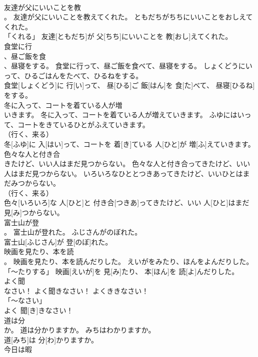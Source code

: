 \documentclass[8pt]{extreport}
\begin{document}
\begin{CJK}{UTF8}{min}
\\	友達が父にいいことを教
\\	。	友達が父にいいことを教えてくれた。	ともだちがちちにいいことをおしえてくれた。	
\\	「くれる」	友達[ともだち]が 父[ちち]にいいことを 教[おし]えてくれた。		
\\	食堂に行
\\	、昼ご飯を食
\\	、昼寝をする。	食堂に行って、昼ご飯を食べて、昼寝をする。	しょくどうにいって、ひるごはんをたべて、ひるねをする。	
\\	食堂[しょくどう]に 行[い]って、 昼[ひる]ご 飯[はん]を 食[た]べて、 昼寝[ひるね]をする。		
\\	冬に入って、コートを着ている人が増
\\	いきます。	冬に入って、コートを着ている人が増えていきます。	ふゆにはいって、コートをきているひとがふえていきます。	
\\	（行く、来る） 
\\	冬[ふゆ]に 入[はい]って、コートを 着[き]ている 人[ひと]が 増[ふ]えていきます。		
\\	色々な人と付き合
\\	きたけど、いい人はまだ見つからない。	色々な人と付き合ってきたけど、いい人はまだ見つからない。	いろいろなひととつきあってきたけど、いいひとはまだみつからない。	
\\	（行く、来る） 
\\	色々[いろいろ]な 人[ひと]と 付き合[つきあ]ってきたけど、いい 人[ひと]はまだ 見[み]つからない。		
\\	富士山が登
\\	。	富士山が登れた。	ふじさんがのぼれた。	
\\	富士山[ふじさん]が 登[のぼ]れた。		
\\	映画を見たり、本を読
\\	。	映画を見たり、本を読んだりした。	えいがをみたり、ほんをよんだりした。	
\\	「～たりする」	映画[えいが]を 見[み]たり、 本[ほん]を 読[よ]んだりした。		
\\	よく聞
\\	なさい！	よく聞きなさい！	よくききなさい！	
\\	「～なさい」 
\\	よく 聞[き]きなさい！		
\\	道は分
\\	か。	道は分かりますか。	みちはわかりますか。	
\\	道[みち]は 分[わ]かりますか。		
\\	今日は暇

\end{CJK}
\end{document}
